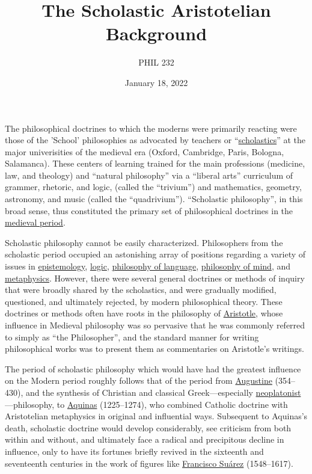\documentclass[12pt]{article}
\author{PHIL 232}
\date{January 18, 2022}
\title{The Scholastic Aristotelian Background}
\begin{document}
\maketitle
\setcounter{tocdepth}{6}
\tableofcontents


The philosophical doctrines to which the moderns were primarily reacting were those
of the 'School' philosophies as advocated by teachers or ``\href{http://en.wikipedia.org/wiki/Scholasticism}{scholastics}'' at the major
univerisities of the medieval era (Oxford, Cambridge, Paris, Bologna, Salamanca).
These centers of learning trained for the main professions (medicine, law, and
theology) and ``natural philosophy'' via a ``liberal arts'' curriculum of grammer,
rhetoric, and logic, (called the ``trivium'') and mathematics, geometry, astronomy, and
music (called the ``quadrivium''). ``Scholastic philosophy'', in this broad sense, thus
constituted the primary set of philosophical doctrines in the \href{http://plato.stanford.edu/entries/medieval-philosophy/}{medieval period}.

Scholastic philosophy cannot be easily characterized. Philosophers from the
scholastic period occupied an astonishing array of positions regarding a variety of
issues in \href{http://plato.stanford.edu/entries/skepticism-medieval/}{epistemology}, \href{http://plato.stanford.edu/entries/medieval-syllogism/}{logic}, \href{http://plato.stanford.edu/entries/medieval-terms/}{philosophy of language}, \href{http://plato.stanford.edu/entries/representation-medieval/}{philosophy of mind}, and
\href{http://plato.stanford.edu/entries/universals-medieval/}{metaphysics}. However, there were several general doctrines or methods of inquiry that
were broadly shared by the scholastics, and were gradually modified, questioned, and
ultimately rejected, by modern philosophical theory. These doctrines or methods often
have roots in the philosophy of \href{http://plato.stanford.edu/entries/aristotle/}{Aristotle}, whose influence in Medieval philosophy was
so pervasive that he was commonly referred to simply as ``the Philosopher'', and the
standard manner for writing philosophical works was to present them as commentaries
on Aristotle's writings.

The period of scholastic philosophy which would have had the greatest influence on
the Modern period roughly follows that of the period from \href{http://plato.stanford.edu/entries/augustine/}{Augustine} (354--430), and
the synthesis of Christian and classical Greek---especially
\href{https://plato.stanford.edu/entries/neoplatonism/}{neoplatonist}---philosophy, to \href{http://plato.stanford.edu/entries/aquinas/}{Aquinas} (1225--1274), who combined Catholic doctrine
with Aristotelian metaphysics in original and influential ways. Subsequent to
Aquinas's death, scholastic doctrine would develop considerably, see criticism from
both within and without, and ultimately face a radical and precipitous decline in
influence, only to have its fortunes briefly revived in the sixteenth and seventeenth
centuries in the work of figures like \href{https://plato.stanford.edu/entries/suarez/}{Francisco Suárez} (1548--1617).
\end{document}
